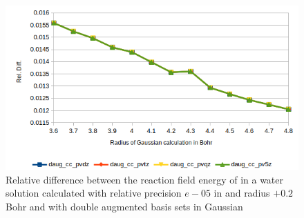 \documentclass[../Thesis.tex]{subfiles}
\begin{document}
\begin{figure}[!htb]
  \centering
    \includegraphics[width=\linewidth]{img/lipdaugreldiff02.png}
  \caption[Relative difference of shifted radius  against Gaussian double augmented results]{Relative difference between the reaction field energy of  in a water solution calculated with relative precision $e-05$ in \mrchem and radius $+ 0.2$ Bohr
  and with double augmented basis sets in Gaussian}
  \label{fig:lipreldiff02daug}
\end{figure}
\end{document}
